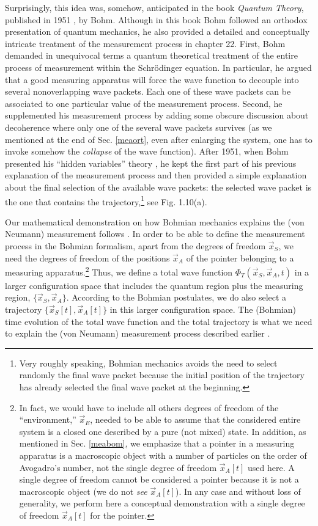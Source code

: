 \documentclass[nofootinbib, secnumarabic, amsmath, nobibnotes,10pt,aps,pra]{revtex4-1}
\newcommand{\sref}[1]{Sec. \ref{#1}}
\begin{document}
Surprisingly, this idea was, somehow, anticipated in the book
\textit{Quantum Theory}, published in 1951 \cite{om.bohmbook}, by
Bohm. Although in this book Bohm followed an orthodox presentation
of quantum mechanics, he also provided a detailed and conceptually
intricate treatment of the measurement process in chapter 22. First,
Bohm demanded in unequivocal terms a quantum theoretical treatment
of the entire process of measurement within the Schr\"odinger
equation. In particular, he argued that a good measuring apparatus
will force the wave function to decouple into several nonoverlapping
wave packets. Each one of these wave packets can be associated to
one particular value of the measurement process. Second, he
supplemented his measurement process by adding some obscure
discussion about decoherence where only one of the several wave
packets survives (as we mentioned at the end of \sref{meaort}, even after enlarging the system, one has to invoke somehow the \emph{collapse} of the wave function). After 1951, when Bohm presented his ``hidden
variables'' theory \cite{om.bohm1952a,om.bohm1952b}, he kept the
first part of his previous explanation of the measurement process
and then provided a simple explanation about the final selection of
the available wave packets: the selected wave packet is the one that
contains the trajectory,\footnote{Very roughly speaking, Bohmian
mechanics avoids the need to select randomly the final wave packet
because the initial position of the trajectory has already selected the final wave packet at the beginning.} see Fig. 1.10(a).\enlargethispage{1pc}

Our mathematical demonstration on how Bohmian mechanics explains the (von Neumann) measurement follows 
\cite{om.Holand1993,om.bomhhiley1993,om.Durrnaive,om.Durrllibre,om.llibreph}. In
order to be able to define the measurement process in the Bohmian
formalism, apart from the degrees of freedom $\vec x_S$, we need the
degrees of freedom of the positions $\vec x_A$ of the pointer belonging to a measuring apparatus.\footnote{In fact, we would have
to include all others degrees of freedom of the ``environment,''
${\vec x_E}$, needed to be able to assume that the considered entire
system is a closed one described by a pure (not mixed)
state. In addition, as mentioned in \sref{meabom}, we emphasize that a pointer in a measuring apparatus is a macroscopic object with a number of particles on the order of Avogadro's number, not the single degree of freedom $\vec x_A[t]$ used here. A single degree of freedom cannot be considered a pointer because it is not a macroscopic object (we do not \emph{see} $\vec x_A[t]$). In any case and without loss of generality, we perform here a conceptual demonstration with a single degree of freedom $\vec x_A[t]$ for the pointer.} Thus, we define a total wave function
$\Phi_T(\vec x_S,\vec x_A,t)$ in a larger configuration space that
includes the quantum region plus the measuring region, $\{\vec
x_S,\vec x_A\}$. According to the Bohmian postulates, we do also
select a trajectory $\{\vec x_S[t],\vec x_A[t]\}$ in this larger
configuration space. The (Bohmian) time evolution of the total wave
function and the total trajectory is what we need to explain the (von Neumann) measurement process
described earlier .
\end{document}
